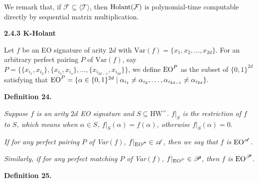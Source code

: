 


We remark that, if $\mathcal{F}\subseteq\langle\mathcal{T}\rangle$, then $\textup{{Holant}}(\mathcal{F})$ is polynomial-time computable directly by sequential matrix multiplication.\par





\par\medskip\noindent\textbf{
2.4.3 K-Holant
}\par




Let $f$ be an EO signature of arity $2d$ with $\text{Var}(f)=\{x_{1},x_{2},\ldots,x_{2d}\}$. For an arbitrary perfect pairing $P$ of $\text{Var}(f)$, say $P=\{\{x_{i_{1}},x_{i_{2}}\},\{x_{i_{3}},x_{i_{4}}\},\ldots,\{x_{i_{2d-1}},x_{i_{2d}}\}\}$, we define $\textup{{EO}}^{P}$ as the subset of $\{0,1\}^{2d}$ satisfying that $\textup{{EO}}^{P}=\{\alpha\in\{0,1\}^{2d}\mid\alpha_{i_{1}}\neq\alpha_{i_{2}},\ldots,\alpha_{i_{2d-1}}\neq\alpha_{i_{2d}}\}.$\par





\par\medskip\noindent\textbf{
\textbf{Definition 24}\textbf{.}
}\par



\emph{Suppose $f$ is an arity $2d$ EO signature and $S\subseteq\text{HW}^{=}$. $f|_{S}$ is the restriction of $f$ to $S$, which means when $\alpha\in S$, $f|_{S}(\alpha)=f(\alpha)$, otherwise $f|_{S}(\alpha)=0$.}\par




\emph{If for any perfect pairing $P$ of Var$(f)$, $f|_{\textup{{EO}}^{P}}\in\mathscr{A}$, then we say that $f$ is $\textup{{EO}}^{\mathscr{A}}$.}\par




\emph{Similarly, if for any perfect matching $P$ of Var$(f)$, $f|_{\textup{{EO}}^{P}}\in\mathscr{P}$, then $f$ is $\textup{{EO}}^{\mathscr{P}}$.}\par







\par\medskip\noindent\textbf{
\textbf{Definition 25}\textbf{.}
}\par



